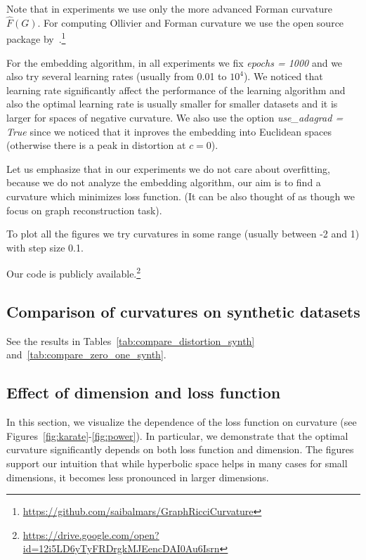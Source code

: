 \documentclass{article} %
\begin{document}
Note that in experiments we use only the more advanced Forman curvature $\hat{F}(G)$.
For computing Ollivier and Forman curvature we use the open source package by~\citet{ni2015ricci}.\footnote{\url{https://github.com/saibalmars/GraphRicciCurvature}}

For the embedding algorithm, in all experiments we fix \textit{epochs = 1000} and we also try several learning rates (usually from 0.01 to $10^4$). We noticed that learning rate significantly affect the performance of the learning algorithm and also the optimal learning rate is usually smaller for smaller datasets and it is larger for spaces of negative curvature. We also use the option \textit{use\_adagrad = True} since we noticed that it inproves the embedding into Euclidean spaces (otherwise there is a peak in distortion at $c = 0$).

Let us emphasize that in our experiments we do not care about overfitting, because we do not analyze the embedding algorithm, our aim is to find a curvature which minimizes loss function. (It can be also thought of as though we focus on graph reconstruction task).

To plot all the figures we try curvatures in some range (usually between -2 and 1) with step size 0.1.

Our code is publicly available.\footnote{\url{https://drive.google.com/open?id=12i5LD6yTyFRDrgkMJEencDAI0Au6Isrn}}

\subsection{Comparison of curvatures on synthetic datasets}\label{sec:compare_synth}

See the results in Tables~\ref{tab:compare_distortion_synth} and~\ref{tab:compare_zero_one_synth}.



\subsection{Effect of dimension and loss function}\label{sec:figures}

In this section, we visualize the dependence of the loss function on curvature (see Figures~\ref{fig:karate}-\ref{fig:power}). In particular, we demonstrate that the optimal curvature significantly depends on both loss function and dimension. The figures support our intuition that while hyperbolic space helps in many cases for small dimensions, it becomes less pronounced in larger dimensions. 
\end{document}
